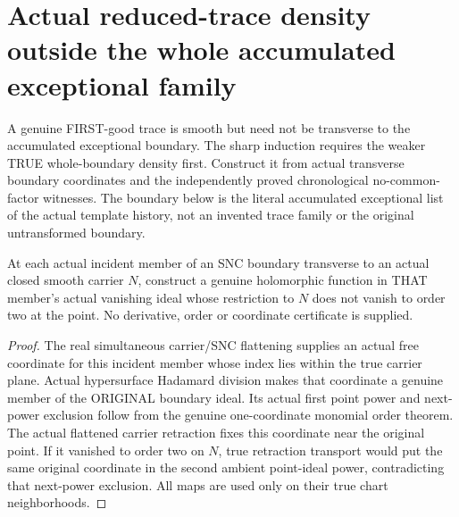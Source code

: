 \section{Actual reduced-trace density outside the whole accumulated exceptional family}

A genuine FIRST-good trace is smooth but need not be transverse to the
accumulated exceptional boundary. The sharp induction requires the weaker
TRUE whole-boundary density first. Construct it from actual transverse
boundary coordinates and the independently proved chronological
no-common-factor witnesses. The boundary below is the literal accumulated
exceptional list of the actual template history, not an invented trace
family or the original untransformed boundary.

\begin{lemma}
\label{hir:sharp-actual-transverse-boundary-coordinate-not-second-order}
\leanok
At each actual incident member of an SNC boundary transverse to an actual
closed smooth carrier $N$, construct a genuine holomorphic function in
THAT member's actual vanishing ideal whose restriction to $N$ does not
vanish to order two at the point. No derivative, order or coordinate
certificate is supplied.
\end{lemma}
\begin{proof}
The real simultaneous carrier/SNC flattening supplies an actual free
coordinate for this incident member whose index lies within the true
carrier plane. Actual hypersurface Hadamard division makes that coordinate
a genuine member of the ORIGINAL boundary ideal. Its actual first point
power and next-power exclusion follow from the genuine one-coordinate
monomial order theorem. The actual flattened carrier retraction fixes
this coordinate near the original point. If it vanished to order two on
$N$, true retraction transport would put the same original coordinate
in the second ambient point-ideal power, contradicting that next-power
exclusion. All maps are used only on their true chart neighborhoods.
\end{proof}

